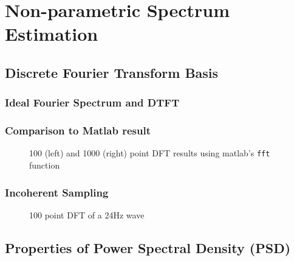 \documentclass[main.tex]{subfiles}
\begin{document}
\section{Non-parametric Spectrum Estimation}

\subsection{Discrete Fourier Transform Basis}

\subsubsection{Ideal Fourier Spectrum and DTFT}

\subsubsection{Comparison to Matlab result}

\begin{figure}[H]
	\centering 
	\resizebox{0.8\textwidth}{!}{}
	\caption{100 (left) and 1000 (right) point DFT results using matlab's {\tt fft} function}
	\label{fig:q1_1_b}
\end{figure}


\subsubsection{Incoherent Sampling}


\begin{figure}[H]
	\centering 
	\resizebox{0.8\textwidth}{!}{}
	\caption{100 point DFT of a 24Hz wave}
	\label{fig:q1_1_c}
\end{figure}






\subsection{Properties of Power Spectral Density (PSD)}


\clearpage
\end{document}
